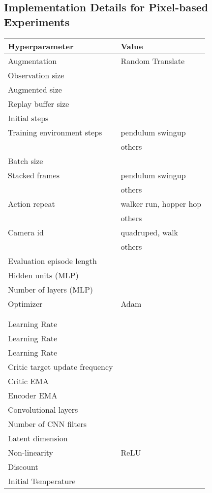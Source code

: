 \documentclass{article} \usepackage{iclr2021_conference,times}
\begin{document}
\subsection{Implementation Details for Pixel-based Experiments}

\begin{center}
\begin{tabular}{l l}
 \hline
 \textbf{Hyperparameter} & \textbf{Value} \\ [0.5ex] 
 \hline
 Augmentation & Random Translate   \\ 
 Observation size &    \\  
 Augmented size &    \\
 Replay buffer size &  \\
 Initial steps &  \\
 Training environment steps &  pendulum swingup\\
 & others\\
 Batch size &  \\
 Stacked frames &  pendulum swingup \\
                &  others \\
 Action repeat &  walker run, hopper hop \\
                &  others \\
 Camera id &  quadruped, walk \\
            &  others \\
 Evaluation episode length &  \\
 Hidden units (MLP) &  \\
 Number of layers (MLP) &  \\ 
 Optimizer & Adam \\
  &  \\
  &  \\
 Learning Rate  &  \\
 Learning Rate  &  \\
 Learning Rate  &  \\ 
 Critic target update frequency & \\
 Critic EMA  &  \\
 Encoder EMA  &  \\
 Convolutional layers &  \\
 Number of CNN filters &  \\
 Latent dimension &  \\
 Non-linearity & ReLU \\
 Discount  &  \\
 Initial Temperature &  \\
 \hline
\end{tabular}
\end{center}
\end{document}

